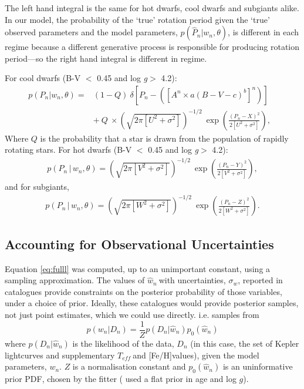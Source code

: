 \documentclass[10pt,preprint]{aastex}
\newcommand{\logg}{log \emph{g}}
\newcommand{\teff}{$T_{eff}$}
\newcommand{\wh}{$\hat{w}_n$}
\newcommand{\feh}{[Fe/H]}
\begin{document}
The left hand integral is the same for hot dwarfs, cool dwarfs and subgiants alike.
In our model, the probability of the `true' rotation period given the `true' observed parameters and the model parameters, $p(\hat{P}_n|w_n, \theta)$, is different in each regime because a different generative process is responsible for producing rotation period---so the right hand integral is different in regime.

For cool dwarfs (B-V $<$ 0.45 and \logg $>$ 4.2):
\begin{eqnarray}
p(P_n|w_n,\theta) =
	& (1-Q)~\delta \left [P_n - \left(\left[A^n \times a(B-V - c)^b\right]^n\right) \right] \quad \\
	& +~Q~\times \left(\sqrt{2\pi[U^2+\sigma^2]}\right)^{-1/2}~\exp\left({\frac{(P_n-X)^2}{2[U^2+\sigma^2]}}\right),
\end{eqnarray}
Where $Q$ is the probability that a star is drawn from the population of rapidly rotating stars.
For hot dwarfs (B-V $<$ 0.45 and \logg $>$ 4.2):
\begin{eqnarray}
p(P_n\,|\,w_n,\theta) = \left(\sqrt{2\pi[V^2+\sigma^2]}\right)^{-1/2}~\exp\left({\frac{(P_n-Y)^2}{2[V^2+\sigma^2]}}\right),
\end{eqnarray}
and for subgiants,
\begin{eqnarray}
p(P_n\,|\,w_n,\theta) = \left(\sqrt{2\pi[W^2+\sigma^2]}\right)^{-1/2}~\exp\left({\frac{(P_n-Z)^2}{2[W^2+\sigma^2]}}\right).
\end{eqnarray}

\subsection{Accounting for Observational Uncertainties}

Equation \ref{eq:fulll} was computed, up to an unimportant constant, using a sampling approximation.
The values of \wh$~$with uncertainties, $\sigma_w$, reported in catalogues provide constraints on the posterior probability of those variables, under a choice of prior.
Ideally, these catalogues would provide posterior samples, not just point estimates, which we could use directly.
i.e. samples from
\begin{equation}
p(w_n|D_n) = \frac{1}{Z}p(D_n|\hat{w}_n)p_0(\hat{w}_n)
\end{equation}
where $p(D_n|\hat{w}_n)$ is the likelihood of the data, $D_n$ (in this case, the set of Kepler lightcurves and supplementary \teff$~$and \feh values), given the model parameters, $w_n$.
$Z$ is a normalisation constant and $p_0(\hat{w}_n)$ is an uninformative prior PDF, chosen by the fitter (\citet{Chaplin2013} used a flat prior in age and log $g$).
\end{document}

